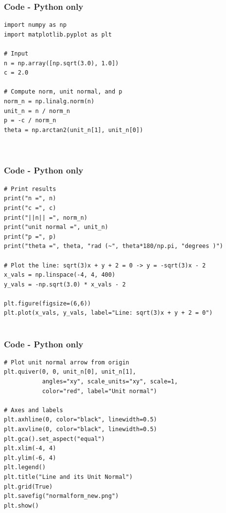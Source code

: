 \documentclass{beamer}
\theoremstyle{remark}
\numberwithin{equation}{section}
\begin{document}
\begin{frame}[fragile]
\frametitle{Code - Python only}
\begin{lstlisting}
import numpy as np
import matplotlib.pyplot as plt

# Input
n = np.array([np.sqrt(3.0), 1.0])
c = 2.0

# Compute norm, unit normal, and p
norm_n = np.linalg.norm(n)
unit_n = n / norm_n
p = -c / norm_n
theta = np.arctan2(unit_n[1], unit_n[0])



\end{lstlisting}
\end{frame}
\begin{frame}[fragile]
\frametitle{Code - Python only}
\begin{lstlisting}
# Print results
print("n =", n)
print("c =", c)
print("||n|| =", norm_n)
print("unit normal =", unit_n)
print("p =", p)
print("theta =", theta, "rad (~", theta*180/np.pi, "degrees )")

# Plot the line: sqrt(3)x + y + 2 = 0 -> y = -sqrt(3)x - 2
x_vals = np.linspace(-4, 4, 400)
y_vals = -np.sqrt(3.0) * x_vals - 2

plt.figure(figsize=(6,6))
plt.plot(x_vals, y_vals, label="Line: sqrt(3)x + y + 2 = 0")


\end{lstlisting}
\end{frame}

\begin{frame}[fragile]
\frametitle{Code - Python only}
\begin{lstlisting}
# Plot unit normal arrow from origin
plt.quiver(0, 0, unit_n[0], unit_n[1],
           angles="xy", scale_units="xy", scale=1,
           color="red", label="Unit normal")

# Axes and labels
plt.axhline(0, color="black", linewidth=0.5)
plt.axvline(0, color="black", linewidth=0.5)
plt.gca().set_aspect("equal")
plt.xlim(-4, 4)
plt.ylim(-6, 4)
plt.legend()
plt.title("Line and its Unit Normal")
plt.grid(True)
plt.savefig("normalform_new.png")
plt.show()


\end{lstlisting}
\end{frame}
\end{document}
